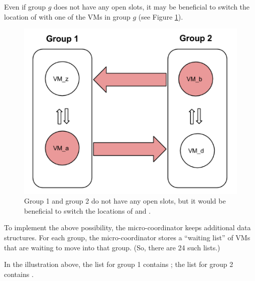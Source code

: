 \documentclass[11pt]{article}
\begin{document}
Even if group $g$ does not have any open slots, it may be beneficial to switch the location of \VMa with one of the VMs in group $g$ (see Figure \ref{fig:micro-switch}).
\begin{figure}
  \centering
\includegraphics[scale=0.65]{micro2.png}

 \caption{Group 1 and group 2 do not have any open slots, but it would be beneficial to switch the locations of \VMa and \VMb.}

 \label{fig:micro-switch}
 
\end{figure}

To implement the above possibility, the micro-coordinator keeps additional data structures.  For each group, the micro-coordinator stores a ``waiting list'' of VMs that are waiting to move into that group.  (So, there are 24 such lists.)

In the illustration above, the list for group 1 contains \VMb; the list for group 2 contains \VMa.
\end{document}
